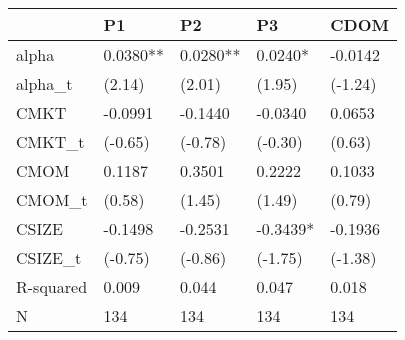 \begin{tabular}{lllll}
\toprule
 & P1 & P2 & P3 & CDOM \\
\midrule
alpha & 0.0380** & 0.0280** & 0.0240* & -0.0142 \\
alpha_t & (2.14) & (2.01) & (1.95) & (-1.24) \\
CMKT & -0.0991 & -0.1440 & -0.0340 & 0.0653 \\
CMKT_t & (-0.65) & (-0.78) & (-0.30) & (0.63) \\
CMOM & 0.1187 & 0.3501 & 0.2222 & 0.1033 \\
CMOM_t & (0.58) & (1.45) & (1.49) & (0.79) \\
CSIZE & -0.1498 & -0.2531 & -0.3439* & -0.1936 \\
CSIZE_t & (-0.75) & (-0.86) & (-1.75) & (-1.38) \\
R-squared & 0.009 & 0.044 & 0.047 & 0.018 \\
N & 134 & 134 & 134 & 134 \\
\bottomrule
\end{tabular}
